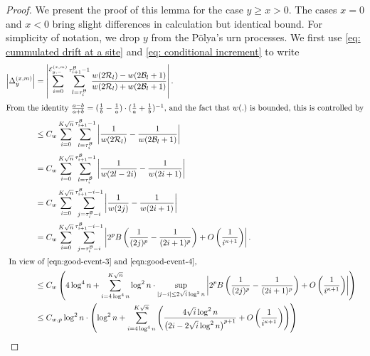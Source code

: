 \documentclass[twoside,12pt, a4paper, final]{article}
\numberwithin{equation}{section}
\theoremstyle{remark}
\newcommand{\edt}[1]{\textcolor{red}{#1}} %
\begin{document}
	\begin{proof}%
		We present the proof of this lemma for the case $y \ge  x > 0$. The cases $x = 0$ and $x<0$ bring slight differences in calculation but identical bound. For simplicity of notation, we drop $y$ from the P\"olya's urn processes. We first use \eqref{eq: cummulated drift at a site} and \eqref{eq: conditional increment} to write 
		\begin{align*}
			\left| \Delta_y^{(x,m)} \right| 
			&= 
			\left| 	\sum_{i = 0}^{\mathcal{E}_{y,-}^{(x,m)}} 
			\sum_{l = \tau_i^{\mathcal{B}}} ^{\tau_{i+1}^{\mathcal{B}}  -1}
			\frac{w(2 \mathcal{R}_l)- w(2 \mathcal{B}_l + 1)}{w(2 \mathcal{R}_l)+ w(2 \mathcal{B}_l + 1)}
			\right| .\\
			\intertext{From the identity $\frac{a - b}{a + b} = (\frac{1}{b} - \frac{1}{a})\cdot(\frac{1}{a} + \frac{1}{b})^{-1}$, and the fact that $w(.)$ is bounded, this is controlled by}
			&\le C_w \sum_{i = 0}^{K \sqrt{n} } \sum_{l = \tau_i^{\mathcal{B}}} ^{\tau_{i+1}^{\mathcal{B}}  -1}
			\left| \frac{1}{w(2 \mathcal{R}_l)} - \frac{1}{w(2 \mathcal{B}_l + 1)} \right|  \\
			&= C_w \sum_{i = 0}^{K \sqrt{n} } \sum_{l = \tau_i^{\mathcal{B}}} ^{\tau_{i+1}^{\mathcal{B}}  -1}
			\left| \frac{1}{w(2 l - 2 i)} - \frac{1}{w(2i + 1)} \right|  \\
			&= C_w \sum_{i = 0}^{K \sqrt{n} }
			\sum_{j = \tau_i^{\mathcal{B}} - i}^{\tau_{i+1}^{\mathcal{B}} - i - 1} \left| \frac{1}{w(2j)} - \frac{1}{w(2i + 1)} \right|  \\
			&= C_w \sum_{i = 0}^{K \sqrt{n} }
			\sum_{j = \tau_i^{\mathcal{B}} - i}^{\tau_{i+1}^{\mathcal{B}} - i - 1} \left|  2^p B\left( \frac{1}{(2j)^p} - \frac{1}{(2i + 1)^p} \right)  + O\left( \frac{1}{i^{\kappa + 1}} \right) \right|  .\\
			\intertext{
				In view of \eqref{eqn:good-event-3} and \eqref{eqn:good-event-4},
			}
			&\le C_w \left(4 \log^4 n + \sum_{i = 4 \log^4 n}^{K \sqrt{n} } \log^2 n \cdot \sup_{|j - i| \le 2 \sqrt{i}  \log^2 n} \left|  2^p B\left( \frac{1}{(2j)^p} - \frac{1}{(2i + 1)^p} \right)  + O\left( \frac{1}{i^{\kappa + 1}} \right) \right|\right)\\
			&\le C_{w, p} \log^2 n \cdot \left( \log^2 n + \sum_{i = 4 \log^4 n}^{K \sqrt{n} } \left( 
			\frac{4 \sqrt{ i } \log^2 n }{\left(2 i - 2 \sqrt{ i } \log^2 n\right)^{p + 1}} 
			+ O\left( \frac{1}{i^{\kappa + 1}} \right)
			\right) \right)  \\

\end{align*}
\end{proof}
\end{document}
